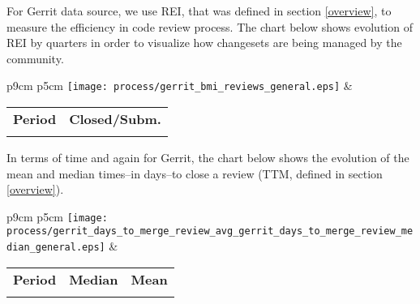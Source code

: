 For Gerrit data source, we use REI, that was defined in section \ref{overview}, to measure the efficiency in code review process. The chart below shows evolution of REI by quarters in order to visualize how changesets are being managed by the community.

\begin{tabular}{p{9cm} p{5cm}}
	\vspace{0pt} 
	\hspace*{-6cm}  
	\texttt{[image: process/gerrit\_bmi\_reviews\_general.eps]}
	& 
	\vspace{0pt}
	\begin{tabular}{l|l}%
		\bfseries Period & \bfseries Closed/Subm. %
		\csvreader[head to column names]{process/gerrit_bmi_reviews_general.csv}{}%
		{\\\Date & \bmireviews}
	\end{tabular}
\end{tabular}

In terms of time and again for Gerrit, the chart below shows the evolution of the mean and median times--in days--to close a review (TTM, defined in section \ref{overview}).

\begin{tabular}{p{9cm} p{5cm}}
	\vspace{0pt} 
	\hspace*{-6cm}  
	\texttt{[image: process/gerrit\_days\_to\_merge\_review\_avg\_gerrit\_days\_to\_merge\_review\_median\_general.eps]}
	& 
	\vspace{0pt}
	\begin{tabular}{l|r|r|}%
		\bfseries Period & \bfseries Median & \bfseries Mean %
		\csvreader[head to column names]{process/gerrit_days_to_merge_review_avg_gerrit_days_to_merge_review_median_general.csv}{}%
		{\\\Date & \daystomergereviewmedian & \daystomergereviewaverage}
	\end{tabular}
\end{tabular}